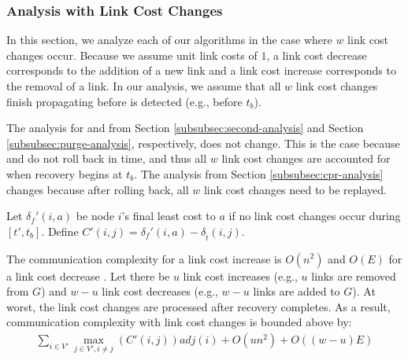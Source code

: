 {{\subsubsection{Analysis with Link Cost Changes}
\label{subsubsec:linkchange-complex}


In this section, we analyze each of our algorithms in the case where $w$ link cost changes occur.  Because we assume unit link costs of $1$, a link cost decrease corresponds to the 
addition of a new link and a link cost increase corresponds to the removal of a link.  In our analysis, we assume that all $w$ link cost changes finish propagating before \bad is detected 
(e.g., before $t_b$).

The analysis for \second and \purge from Section \ref{subsubsec:second-analysis} and Section \ref{subsubsec:purge-analysis}, respectively, does not change.  This is the 
case because \second and \purge do not roll back in time, and thus all $w$ link cost changes are accounted for when recovery begins at $t_b$.  
The \cpr analysis from Section \ref{subsubsec:cpr-analysis} changes because after rolling back, all $w$ link cost changes need to be replayed. 

Let $\delta_{f}'(i,a)$ be node $i$'s final least cost to $a$ if no link cost changes occur during $[t',t_b]$.  Define 
$C'(i,j) = \delta_{f}'(i,a) - \delta_{\hat{t}}(i,j)$.

The communication complexity for a link cost increase is $O(n^2)$ \cite{Johnson84} and $O(E)$ for a link cost decrease \cite{Johnson84b}.  Let there be $u$ link cost increases (e.g., $u$ links are 
removed from $G$) and $w-u$ link cost decreases (e.g., $w-u$ links are added to $G$).
At worst, the link cost changes are processed after \bad recovery completes. As a result, \cpr communication complexity with link cost changes is bounded above by:
\begin{eqnarray}
\label{thm:cpr-link-change}
\sum_{i \in V'} \max_{j \in V', i \neq j} \left( C'(i,j) \right) adj(i) + O(un^2) + O\left((w-u)E\right)
\end{eqnarray}


}}
